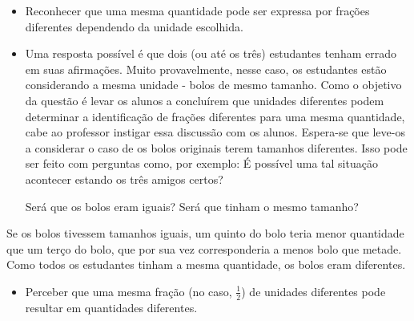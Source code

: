 \begin{multicols}{2}
\begin{solucao}{}{}
\end{solucao}


\begin{objetivos}{}{}
\begin{itemize} %
    \item Reconhecer que uma mesma quantidade pode ser expressa por frações diferentes dependendo da unidade escolhida.
\end{itemize} %
\end{objetivos}

\begin{orientacoes}

  \begin{itemize} %
  \item Uma resposta possível é que dois (ou até os três) estudantes tenham errado em suas afirmações.    Muito provavelmente, nesse caso, os estudantes estão considerando a mesma unidade - bolos de mesmo tamanho. 
Como o objetivo da questão é levar os alunos a concluírem que unidades diferentes podem determinar a identificação de frações diferentes para uma mesma quantidade, cabe ao professor instigar essa discussão com os alunos. Espera-se que leve-os a considerar o caso de os bolos originais terem tamanhos diferentes. Isso pode ser feito com perguntas como, por exemplo: É possível uma tal situação acontecer estando os três amigos certos?

Será que os bolos eram iguais? Será que tinham o mesmo tamanho? 
\end{itemize}
\end{orientacoes}

\begin{solucao}{}{}
  Se os bolos tivessem tamanhos iguais, um quinto do bolo teria menor quantidade que um terço do bolo, que por sua vez corresponderia a menos bolo que metade. Como todos os estudantes tinham a mesma quantidade, os bolos eram diferentes.

  \end{solucao}


\begin{objetivos}{}{}
  \begin{itemize} %
    \item       Perceber que uma mesma fração (no caso, $\frac{1}{2}$) de unidades diferentes pode resultar em quantidades diferentes.
\end{itemize} %
\end{objetivos}


\end{multicols}
